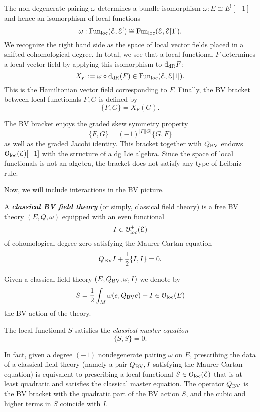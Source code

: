 \documentclass[10pt, oneside]{article}
\newcommand{\defterm}[1]{\textbf{\emph{#1}}}
\begin{document}
The non-degenerate pairing $\omega$ determines a bundle isomorphism $\omega \colon E \cong E^! [-1]$ and hence an isomorphism of local functions
\[
\omega : {\rm Fun}_{\rm loc}(\mathcal E, \mathcal E^!) \cong {\rm Fun}_{\rm loc}(\mathcal E, \mathcal E[1]) .
\]
We recognize the right hand side as the space of local vector fields placed in a shifted cohomological degree.
In total, we see that a local functional $F$ determines a local vector field by applying this isomorphism to ${\rm d}_{\mathrm{dR}}F$:
\[
X_F := \omega \circ {\rm d}_{\mathrm{dR}} (F) \in  {\rm Fun}_{\rm loc}(\mathcal E, \mathcal E[1])  .
\]
This is the Hamiltonian vector field corresponding to $F$. 
Finally, the BV bracket between local functionals $F, G$ is defined by
\[
\{F, G\} = X_F (G) .
\]

The BV bracket enjoys the graded skew symmetry property
\[
\{F, G\} = (-1)^{|F| |G|} \{G, F\}
\]
as well as the graded Jacobi identity.
This bracket together wtih $Q_{\mathrm{BV}}$ endows $\mathcal{O}_{\rm loc}(\mathcal E)[-1]$ with the structure of a dg Lie algebra. 
Since the space of local functionals is not an algebra, the bracket does not satisfy any type of Leibniz rule. 


Now, we will include interactions in the BV picture. 

\begin{definition}
A \defterm{classical BV field theory} (or simply, classical field theory) is a free BV theory $(E, Q, \omega)$ equipped with an even functional
\[I \in \mathcal{O}_{\rm loc}^+(\mathcal E)\]
of cohomological degree zero satisfying the Maurer-Cartan equation
\[Q_{\mathrm{BV}} I + \frac{1}{2} \{I,I\} = 0 .\]
\end{definition}

Given a classical field theory $(E, Q_{\mathrm{BV}}, \omega, I)$ we denote by
\[S = \frac{1}{2} \int_M \omega(e, Q_{\mathrm{BV}} e) + I\in \mathcal{O}_{\rm loc}(E)\]
the BV action of the theory.

The local functional $S$ satisfies the {\em classical master equation} \[\{S, S\} = 0.\] 

In fact, given a degree $(-1)$ nondegenerate pairing $\omega$ on $E$, prescribing the data of a classical field theory (namely a pair $Q_{\mathrm{BV}}, I$ satisfying the Maurer-Cartan equation) is equivalent to prescribing a local functional $S \in \mathcal{O}_{\rm loc}(\mathcal E)$ that is at least quadratic and satisfies the classical master equation.
The operator $Q_{\mathrm{BV}}$ is the BV bracket with the quadratic part of the BV action $S$, and the cubic and higher terms in $S$ coincide with $I$.
\end{document}

